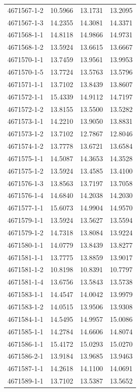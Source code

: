 \begin{longtable}{lrrr}
4671567-1-2 & 10.5966 & 13.1731 & 13.2095 \\
4671567-1-3 & 14.2355 & 14.3081 & 14.3371 \\
4671568-1-1 & 14.8118 & 14.9866 & 14.9731 \\
4671568-1-2 & 13.5924 & 13.6615 & 13.6667 \\
4671570-1-1 & 13.7459 & 13.9561 & 13.9953 \\
4671570-1-5 & 13.7724 & 13.5763 & 13.5796 \\
4671571-1-1 & 13.7102 & 13.8439 & 13.8607 \\
4671572-1-1 & 15.4339 & 14.9112 & 14.7197 \\
4671572-1-2 & 13.8155 & 13.5500 & 13.5282 \\
4671573-1-1 & 14.2210 & 13.9050 & 13.8831 \\
4671573-1-2 & 13.7102 & 12.7867 & 12.8046 \\
4671574-1-2 & 13.7778 & 13.6721 & 13.6584 \\
4671575-1-1 & 14.5087 & 14.3653 & 14.3528 \\
4671575-1-2 & 13.5924 & 13.4585 & 13.4100 \\
4671576-1-3 & 13.8563 & 13.7197 & 13.7058 \\
4671576-1-4 & 14.6840 & 14.2038 & 14.2030 \\
4671577-1-1 & 15.6073 & 14.9904 & 14.9570 \\
4671579-1-1 & 13.5924 & 13.5627 & 13.5594 \\
4671579-1-2 & 14.7318 & 13.8084 & 13.9224 \\
4671580-1-1 & 14.0779 & 13.8439 & 13.8277 \\
4671581-1-1 & 13.7775 & 13.8859 & 13.9017 \\
4671581-1-2 & 10.8198 & 10.8391 & 10.7797 \\
4671581-1-4 & 13.6756 & 13.5843 & 13.5738 \\
4671583-1-1 & 14.4547 & 14.0042 & 13.9979 \\
4671583-1-2 & 14.0515 & 13.9506 & 13.9308 \\
4671584-1-1 & 14.5495 & 14.9957 & 15.0086 \\
4671585-1-1 & 14.2784 & 14.6606 & 14.8074 \\
4671586-1-1 & 15.4172 & 15.0293 & 15.0270 \\
4671586-2-1 & 13.9184 & 13.9685 & 13.9463 \\
4671587-1-1 & 14.2618 & 14.1100 & 14.0691 \\
4671589-1-1 & 13.7102 & 13.5387 & 13.5652 \\

\end{longtable}
